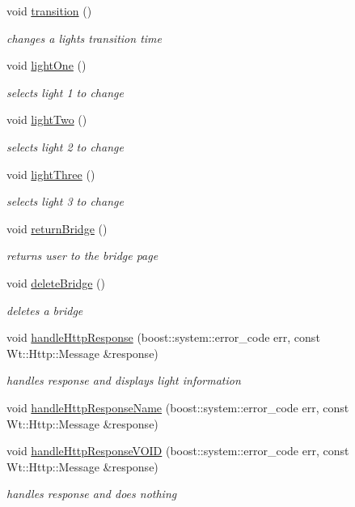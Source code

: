\begin{DoxyCompactItemize}
void \hyperlink{classLightsControlWidget_a10fad17f0722f34402a906c77c1711bb}{transition} ()
\begin{DoxyCompactList}\small\item\em changes a light\textquotesingle{}s transition time \end{DoxyCompactList}\item 
void \hyperlink{classLightsControlWidget_aedb19ca01377b31ba326bd0e0f82138d}{light\+One} ()
\begin{DoxyCompactList}\small\item\em selects light 1 to change \end{DoxyCompactList}\item 
void \hyperlink{classLightsControlWidget_a8606dd33428f5c5cd7a1e686053b296d}{light\+Two} ()
\begin{DoxyCompactList}\small\item\em selects light 2 to change \end{DoxyCompactList}\item 
void \hyperlink{classLightsControlWidget_a670eae4637f1cc78febb3a751e4272dc}{light\+Three} ()
\begin{DoxyCompactList}\small\item\em selects light 3 to change \end{DoxyCompactList}\item 
void \hyperlink{classLightsControlWidget_a4b17ac832e826eb5665a8f69fe73c5f4}{return\+Bridge} ()
\begin{DoxyCompactList}\small\item\em returns user to the bridge page \end{DoxyCompactList}\item 
void \hyperlink{classLightsControlWidget_aa34bd45ed4b9e07481634641bfa49736}{delete\+Bridge} ()
\begin{DoxyCompactList}\small\item\em deletes a bridge \end{DoxyCompactList}\item 
void \hyperlink{classLightsControlWidget_a0fd696e3500ca64cfeddd08738e5b6cf}{handle\+Http\+Response} (boost\+::system\+::error\+\_\+code err, const Wt\+::\+Http\+::\+Message \&response)
\begin{DoxyCompactList}\small\item\em handles response and displays light information \end{DoxyCompactList}\item 
void \hyperlink{classLightsControlWidget_ace0f0ce6387f25f695ac83a46a765a74}{handle\+Http\+Response\+Name} (boost\+::system\+::error\+\_\+code err, const Wt\+::\+Http\+::\+Message \&response)
\item 
void \hyperlink{classLightsControlWidget_a9cc86543ee2df1d0bb09c35b0e2fac90}{handle\+Http\+Response\+V\+O\+ID} (boost\+::system\+::error\+\_\+code err, const Wt\+::\+Http\+::\+Message \&response)
\begin{DoxyCompactList}\small\item\em handles response and does nothing \end{DoxyCompactList}\end{DoxyCompactItemize}
